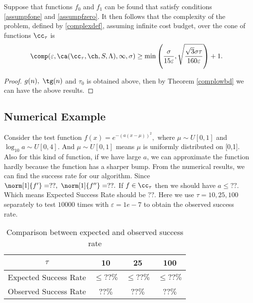 \begin{theorem} \label{complowbdinteg} Suppose that functions $f_{0}$ and $f_1$ can be found that satisfy conditions \eqref{assumpfone} and \eqref{assumpfzero}.  It then follows that the complexity of the problem, defined by \eqref{complexdef}, assuming infinite cost budget, over the cone of functions $\cc_{\tau}$ is
$$
\comp(\varepsilon,\ca(\cc_{\tau},\ch,S,\Lambda),\infty,\sigma)
\ge \min\left(\frac{\sigma}{15\varepsilon},\sqrt{\frac{\sqrt{3}\sigma\tau}{160\varepsilon}}\right)+1.
$$
\end{theorem}

\begin{proof}
$g(n), \ \tg(n)$ and $\tau_0$ is obtained above, then by Theorem \ref{complowbd}
we can have the above results.
\end{proof}

\subsection{Numerical Example}
Consider the test function $f(x)=e^{-(a(x-\mu))^2},$
where $\mu \sim U[0,1]$ and $\log_{10} a \sim U[0,4].$
And $\mu \sim U[0,1]$ means $\mu$ is uniformly distributed on [0,1].
Also for this kind of function, if we have large $a$, we can approximate the function hardly
because the function has a sharper bump. From the numerical results, we can find the success rate for our algorithm. Since $\norm[1]{f'}=??, \ \norm[1]{f''}=??.$
If $f \in \cc_{\tau}$ then we should have
$a \leq ??.$ Which means Expected Success Rate should be $??.$
Here we use $\tau = 10, 25 , 100$ separately to test $10000$ times with
$\varepsilon = 1e-7$ to obtain the observed success rate.
\begin{table}[h]
\centering
\begin{tabular}{cccc}
$\tau$ &  10 & 25 & 100\\
\toprule
Expected Success Rate &  $\leq ?? \%$ &  $\leq ?? \%$  & $\leq ?? \%$ \\
Observed Success Rate & ??$\%$ &  ??$\%$  & ??$\%$ \\
\end{tabular}
\caption{ Comparison between expected and observed success rate}
\end{table}

